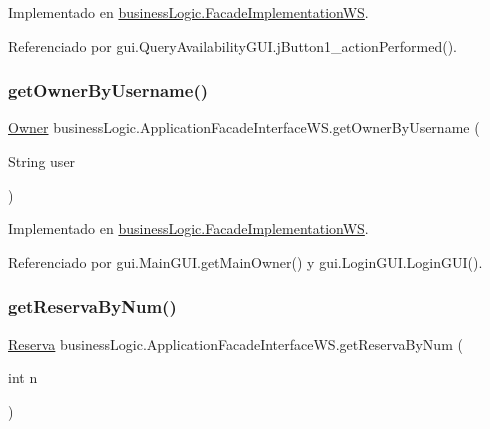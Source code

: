 Implementado en \mbox{\hyperlink{classbusiness_logic_1_1_facade_implementation_w_s_a7489fb15fdb8206b16daf6ed24fdfea0}{business\+Logic.\+Facade\+Implementation\+WS}}.



Referenciado por gui.\+Query\+Availability\+G\+U\+I.\+j\+Button1\+\_\+action\+Performed().

\mbox{\label{interfacebusiness_logic_1_1_application_facade_interface_w_s_a0f38b3b41794e2ec57b019b89ef255c3}} 
\subsubsection{\texorpdfstring{getOwnerByUsername()}{getOwnerByUsername()}}
{\footnotesize\ttfamily \mbox{\hyperlink{classdomain_1_1_owner}{Owner}} business\+Logic.\+Application\+Facade\+Interface\+W\+S.\+get\+Owner\+By\+Username (\begin{DoxyParamCaption}\item[{String}]{user }\end{DoxyParamCaption})}



Implementado en \mbox{\hyperlink{classbusiness_logic_1_1_facade_implementation_w_s_a2e7c07eb23b062294ea3f5aaa48285a5}{business\+Logic.\+Facade\+Implementation\+WS}}.



Referenciado por gui.\+Main\+G\+U\+I.\+get\+Main\+Owner() y gui.\+Login\+G\+U\+I.\+Login\+G\+U\+I().

\mbox{\label{interfacebusiness_logic_1_1_application_facade_interface_w_s_a1ee7d830657be2563a277591c150f273}} 
\subsubsection{\texorpdfstring{getReservaByNum()}{getReservaByNum()}}
{\footnotesize\ttfamily \mbox{\hyperlink{classdomain_1_1_reserva}{Reserva}} business\+Logic.\+Application\+Facade\+Interface\+W\+S.\+get\+Reserva\+By\+Num (\begin{DoxyParamCaption}\item[{int}]{n }\end{DoxyParamCaption})}



